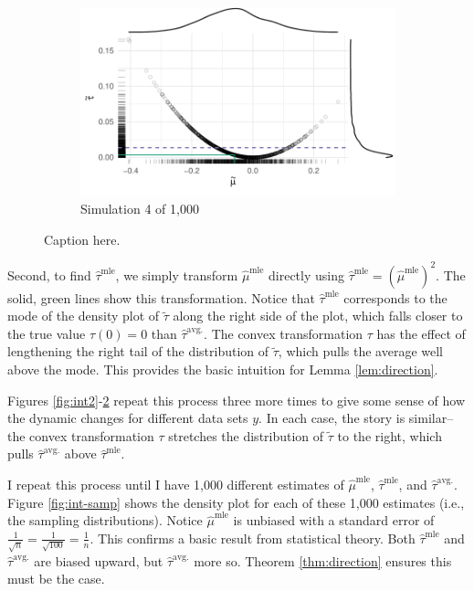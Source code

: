 \documentclass[10pt]{article}
\begin{document}
\begin{figure}
\begin{subfigure}{.5\textwidth}
  \label{fig:int3}
\end{subfigure}%
\begin{subfigure}{.5\textwidth}
  \centering
  \includegraphics[width=.8\linewidth]{figs/intuition-4.pdf}
  \caption{Simulation 4 of 1,000}
  \label{fig:int4}
\end{subfigure}
\caption{Caption here.}
\label{fig:int}
\end{figure}

Second, to find $\hat{\tau}^\text{mle}$, we simply transform $\hat{\mu}^\text{mle}$ directly using $\hat{\tau}^\text{mle} = \left( \hat{\mu}^\text{mle} \right) ^2$. 
The solid, green lines show this transformation. 
Notice that $\hat{\tau}^\text{mle}$ corresponds to the mode of the density plot of $\tilde{\tau}$ along the right side of the plot, which falls closer to the true value $\tau(0) = 0$ than $\hat{\tau}^\text{avg.}$.
The convex transformation $\tau$ has the effect of lengthening the right tail of the distribution of $\tilde{\tau}$, which pulls the average well above the mode. 
This provides the basic intuition for Lemma \ref{lem:direction}.

Figures \ref{fig:int2}-\ref{fig:int4} repeat this process three more times to give some sense of how the dynamic changes for different data sets $y$.
In each case, the story is similar--the convex transformation $\tau$ stretches the distribution of $\tilde{\tau}$ to the right, which pulls $\hat{\tau}^\text{avg.}$ above $\hat{\tau}^\text{mle}$.

I repeat this process until I have 1,000 different estimates of $\hat{\mu}^\text{mle}$, $\hat{\tau}^\text{mle}$, and $\hat{\tau}^\text{avg.}$. 
Figure \ref{fig:int-samp} shows the density plot for each of these 1,000 estimates (i.e., the sampling distributions).
Notice $\hat{\mu}^\text{mle}$ is unbiased with a standard error of $\frac{1}{\sqrt{n}} = \frac{1}{\sqrt{100}} = \frac{1}{n}$.  
This confirms a basic result from statistical theory.
Both $\hat{\tau}^\text{mle}$ and $\hat{\tau}^\text{avg.}$ are biased upward, but $\hat{\tau}^\text{avg.}$ more so. 
Theorem \ref{thm:direction} ensures this must be the case. 
\end{document}
